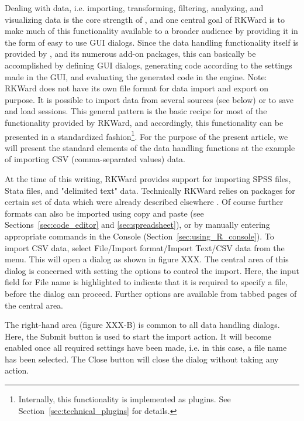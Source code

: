 Dealing with data, i.e. importing, transforming, filtering, analyzing, and visualizing data is the core
strength of , and one central goal of
RKWard is to make much of this functionality available to a broader
audience by providing it in the form of easy to use GUI dialogs. Since
the data handling functionality itself is provided by
, and its numerous add-on packages, this
can basically be accomplished by defining GUI dialogs, generating
 code according to the settings made in
the GUI, and evaluating the generated code in the
 engine. Note: RKWard does not have its
own file format for data import and export on purpose. It is possible
to import data from several sources (see below) or to save and load
 sessions. This general pattern is the
basic recipe for most of the functionality provided by RKWard, and
accordingly, this functionality can be presented in a standardized
fashion\footnote{Internally, this functionality is implemented as
plugins. See Section~\ref{sec:technical_plugins} for details.}. For
the purpose of the present article, we will present the standard
elements of the data handling functions at the example of importing CSV
(comma-separated values) data.

At the time of this writing, RKWard provides support for importing SPSS
files, Stata files, and "delimited text" data. Technically RKWard
relies on  packages for certain set of
data which were already described elsewhere
\citep{Murdoch2002}. Of course further formats can
also be imported using copy and paste (see Sections~\ref{sec:code_editor} and \ref{sec:spreadsheet}), or by
manually entering appropriate  commands in
the  Console (Section~\ref{sec:using_R_console}). To import CSV
data, select File/Import format/Import Text/CSV
data from the menu. This will open a dialog as shown in
figure XXX. The central area of this dialog is concerned with setting
the options to control the import. Here, the input field for
File name is highlighted to indicate that
it is required to specify a file, before the dialog can proceed.
Further options are available from tabbed pages of the central area.

The right-hand area (figure XXX-B) is common to all data handling
dialogs. Here, the Submit button is used
to start the import action. It will become enabled once all required
settings have been made, i.e. in this case, a file name has been
selected. The Close button will close the
dialog without taking any action.

